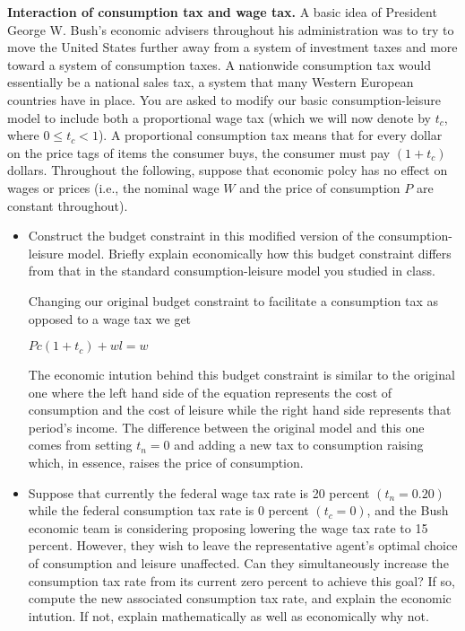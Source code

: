 \documentclass[11pt]{SelfArxOneColBMN}
\affiliation{\textsuperscript{1}\textit{John E. Walker Department of Economics,
Clemson University,Clemson, SC: email ijdavis@g.clemson.edu}}
\date{\small{Version ~\today}}
\begin{document}
\flushbottom

\maketitle


	
\begin{exercise}
\textbf{Interaction of consumption tax and wage tax.} A basic idea of President George W. Bush's economic advisers throughout his administration was to try to move the United States further away from a system of investment taxes and more toward a system of consumption taxes. A nationwide consumption tax would essentially be a national sales tax, a system that many Western European countries have in place. You are asked to modify our basic consumption-leisure model to include both a proportional wage tax (which we will now denote by $t_c$, where $0 \leq t_c < 1$). A proportional consumption tax means that for every dollar on the price tags of items the consumer buys, the consumer must pay $(1 + t_c)$ dollars. Throughout the following, suppose that economic polcy has no effect on wages or prices (i.e., the nominal wage $W$ and the price of consumption $P$ are constant throughout).

\begin{itemize}
\item Construct the budget constraint in this modified version of the consumption-leisure model. Briefly explain economically how this budget constraint differs from that in the standard consumption-leisure model you studied in class.

	\begin{solution}
		Changing our original budget constraint to facilitate a consumption tax as opposed to a wage tax we get
		\begin{center}
			$Pc(1 + t_c) + wl = w$
		\end{center}
		The economic intution behind this budget constraint is similar to the original one where the left hand side of the equation represents the cost of consumption and the cost of leisure while the right hand side represents that period's income. The difference between the original model and this one comes from setting $t_n = 0$ and adding a new tax to consumption raising which, in essence, raises the price of consumption.
	\end{solution}

\item Suppose that currently the federal wage tax rate is 20 percent $(t_n = 0.20)$ while the federal consumption tax rate is 0 percent $(t_c =0)$, and the Bush economic team is considering proposing lowering the  wage tax rate to 15 percent. However, they wish to leave the representative agent's optimal choice of consumption and leisure unaffected. Can they simultaneously increase the consumption tax rate from its current zero percent to achieve this goal? If so, compute the new associated consumption tax rate, and explain the economic intution. If not, explain mathematically as well as economically why not.


\end{itemize}
\end{exercise}
\end{document}
